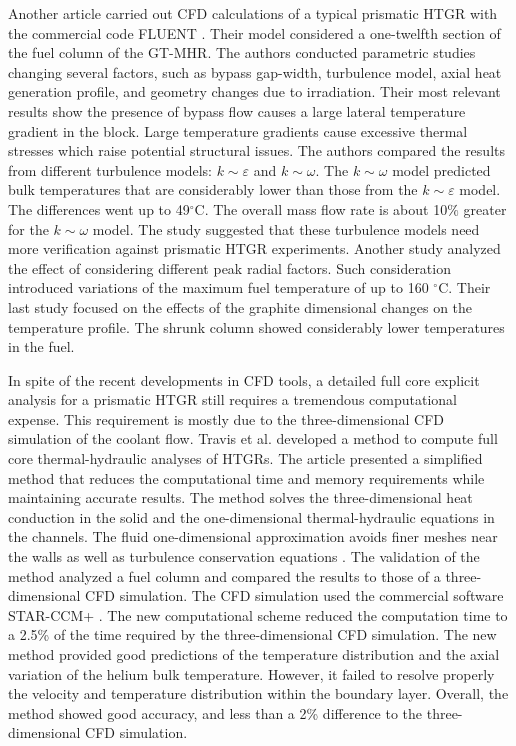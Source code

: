 \documentclass[11pt,letterpaper]{article}
\begin{document}
Another article \cite{sato_computational_2010} carried out \gls{CFD} calculations of a typical prismatic \gls{HTGR} with the commercial code FLUENT \cite{fluent_inc_fluent_2006}.
Their model considered a one-twelfth section of the fuel column of the GT-MHR.
The authors conducted parametric studies changing several factors, such as bypass gap-width, turbulence model, axial heat generation profile, and geometry changes due to irradiation.
Their most relevant results show the presence of bypass flow causes a large lateral temperature gradient in the block.
Large temperature gradients cause excessive thermal stresses which raise potential structural issues.
The authors compared the results from different turbulence models: $k \sim \varepsilon$ and $k \sim \omega$.
The $k \sim \omega$ model predicted bulk temperatures that are considerably lower than those from the $k \sim \varepsilon$ model.
The differences went up to 49$^{\circ}$C.
The overall mass flow rate is about 10$\%$ greater for the $k \sim \omega$ model.
The study suggested that these turbulence models need more verification against prismatic \gls{HTGR} experiments.
Another study analyzed the effect of considering different peak radial factors.
Such consideration introduced variations of the maximum fuel temperature of up to 160 $^{\circ}$C.
Their last study focused on the effects of the graphite dimensional changes on the temperature profile.
The shrunk column showed considerably lower temperatures in the fuel.

In spite of the recent developments in CFD tools, a detailed full core explicit analysis for a prismatic \gls{HTGR} still requires a tremendous computational expense.
This requirement is mostly due to the three-dimensional CFD simulation of the coolant flow.
Travis et al. \cite{travis_thermalhydraulics_2013} developed a method to compute full core thermal-hydraulic analyses of \glspl{HTGR}.
The article presented a simplified method that reduces the computational time and memory requirements while maintaining accurate results.
The method solves the three-dimensional heat conduction in the solid and the one-dimensional thermal-hydraulic equations in the channels.
The fluid one-dimensional approximation avoids finer meshes near the walls as well as turbulence conservation equations \cite{tak_development_2014}.
The validation of the method analyzed a fuel column and compared the results to those of a three-dimensional CFD simulation.
The CFD simulation used the commercial software STAR-CCM+ \cite{cd-adapco_star-ccm_2012}.
The new computational scheme reduced the computation time to a 2.5\% of the time required by the three-dimensional CFD simulation.
The new method provided good predictions of the temperature distribution and the axial variation of the helium bulk temperature.
However, it failed to resolve properly the velocity and temperature distribution within the boundary layer.
Overall, the method showed good accuracy, and less than a 2\% difference to the three-dimensional CFD simulation.
\end{document}

